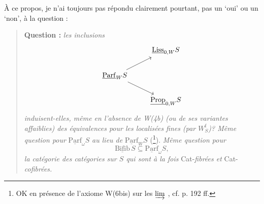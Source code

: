 \documentclass[11pt]{article}
\newcommand{\Parf}{\underline{\mathrm{Parf}}}
\newcommand{\Liss}{\underline{\mathrm{Liss}}}
\newcommand{\Prop}{\underline{\mathrm{Prop}}}
\newcommand{\Bifib}{\underline{\mathrm{Bifib}}}
\begin{document}
À ce propos, je n'ai toujours pas répondu clairement pourtant, pas un ‘oui’ ou un ‘non’, à la question :

\begin{quote}
\textbf{Question :} \textit{les inclusions}
\[
\begin{tikzcd}
 & \Liss_{0,W}S \\
\Parf_W S \arrow[ur] \arrow[dr] & \\
 & \Prop_{0,W}S
\end{tikzcd}
\]
\textit{induisent-elles, même en l'absence de W(4b) (ou de ses variantes affaiblies) des équivalences pour les localisées fines (par $W^{\mathrm{f}}_S$)? Même question pour} $\Parf_\omega S$ \textit{au lieu de} $\Parf_W S$ (\footnote{OK en présence de l'axiome W(6bis) sur les $\varinjlim$ , cf. p. 192 ff.}). \textit{Même question pour}
\[ \Bifib\, S \subseteq \Parf_\omega S, \]
\textit{la catégorie des catégories sur $S$ qui sont à la fois} Cat-\textit{fibrées et} Cat-\textit{cofibrées.}
\end{quote}
\end{document}
